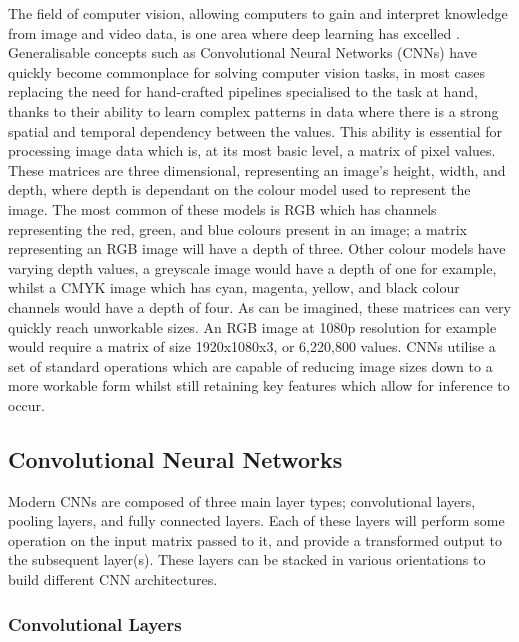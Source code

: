 The field of computer vision, allowing computers to gain and interpret knowledge from image and video data, is one area where deep learning has excelled \cite{voulodimos_deep_2018}. Generalisable concepts such as Convolutional Neural Networks (CNNs) have quickly become commonplace for solving computer vision tasks, in most cases replacing the need for hand-crafted pipelines specialised to the task at hand, thanks to their ability to learn complex patterns in data where there is a strong spatial and temporal dependency between the values. This ability is essential for processing image data which is, at its most basic level, a matrix of pixel values. These matrices are three dimensional, representing an image's height, width, and depth, where depth is dependant on the colour model used to represent the image. The most common of these models is RGB which has channels representing the red, green, and blue colours present in an image; a matrix representing an RGB image will have a depth of three. Other colour models have varying depth values, a greyscale image would have a depth of one for example, whilst a CMYK image which has cyan, magenta, yellow, and black colour channels would have a depth of four. As can be imagined, these matrices can very quickly reach unworkable sizes. An RGB image at 1080p resolution for example would require a matrix of size 1920x1080x3, or 6,220,800 values. CNNs utilise a set of standard operations which are capable of reducing image sizes down to a more workable form whilst still retaining key features which allow for inference to occur. 

\subsection{Convolutional Neural Networks}\label{ch:Background,sec:CNN,sub:CNN}
Modern CNNs are composed of three main layer types; convolutional layers, pooling layers, and fully connected layers. Each of these layers will perform some operation on the input matrix passed to it, and provide a transformed output to the subsequent layer(s). These layers can be stacked in various orientations to build different CNN architectures.

\subsubsection{Convolutional Layers}\label{ch:Background,sec:CNN,sub:CNN,subsub:convolution}

